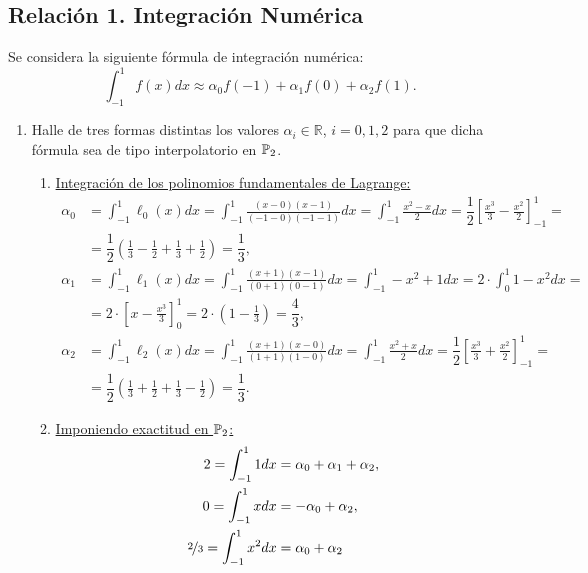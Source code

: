 \subsection{Relación 1. Integración Numérica}
\setcounter{ejercicio}{8}

\begin{ejercicio}\label{ej:2.1.9}
    Se considera la siguiente fórmula de integración numérica:
    \begin{equation*}
        \int_{-1}^{1} f(x) dx \approx \alpha_0 f(-1) + \alpha_1 f(0) + \alpha_2 f(1).
    \end{equation*}
    \begin{enumerate}
        \item Halle de tres formas distintas los valores $\alpha_i \in \mathbb{R}$, $i = 0, 1, 2$ para que dicha fórmula sea de tipo interpolatorio en $\mathbb{P}_2$.
        
        \begin{enumerate}
            \item \ul{Integración de los polinomios fundamentales de Lagrange:}
            \begin{align*}
                \alpha_0 &= \int_{-1}^{1} \ell_0(x) dx = \int_{-1}^{1} \frac{(x - 0)(x - 1)}{(-1 - 0)(-1 - 1)} dx = \int_{-1}^{1} \frac{x^2 - x}{2} dx = \dfrac{1}{2} \left[ \frac{x^3}{3} - \frac{x^2}{2} \right]_{-1}^{1} =\\&= \dfrac{1}{2} \left( \frac{1}{3} - \frac{1}{2} + \frac{1}{3} + \frac{1}{2} \right) = \dfrac{1}{3},\\
                \alpha_1 &= \int_{-1}^{1} \ell_1(x) dx = \int_{-1}^{1} \frac{(x + 1)(x - 1)}{(0 + 1)(0 - 1)} dx = \int_{-1}^{1} -x^2 + 1 dx = 2\cdot \int_{0}^{1} 1-x^2 dx =\\&= 2\cdot \left[ x - \frac{x^3}{3} \right]_{0}^{1} = 2\cdot \left( 1 - \frac{1}{3} \right) = \dfrac{4}{3},\\
                \alpha_2 &= \int_{-1}^{1} \ell_2(x) dx = \int_{-1}^{1} \frac{(x + 1)(x - 0)}{(1 + 1)(1 - 0)} dx = \int_{-1}^{1} \frac{x^2 + x}{2} dx = \dfrac{1}{2} \left[ \frac{x^3}{3} + \frac{x^2}{2} \right]_{-1}^{1} =\\&= \dfrac{1}{2} \left( \frac{1}{3} + \frac{1}{2} + \frac{1}{3} - \frac{1}{2} \right) = \dfrac{1}{3}.
            \end{align*}

            \item \ul{Imponiendo exactitud en $\mathbb{P}_2$:}
            \begin{align*}
                2 = \int_{-1}^{1} 1 dx &= \alpha_0 + \alpha_1 + \alpha_2,\\
                0 = \int_{-1}^{1} x dx &= -\alpha_0 + \alpha_2,\\
                \nicefrac{2}{3} = \int_{-1}^{1} x^2 dx &= \alpha_0 + \alpha_2
            \end{align*}


\end{enumerate}
\end{enumerate}
\end{ejercicio}

